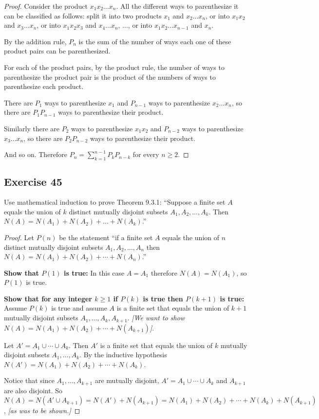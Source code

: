 \documentclass[14pt]{extarticle}
\begin{document}
\begin{proof}
     Consider the product \(x_1x_2 \ldots x_n\). All the different ways to parenthesize it can be classified as
     follows: split it into two products \(x_1\) and \(x_2 \ldots x_n\), or into \(x_1x_2\) and \(x_3 \ldots x_n\),
     or into \(x_1x_2x_3\) and \(x_4 \ldots x_n\), \(\ldots\), or into \(x_1x_2 \ldots x_{n-1}\) and \(x_n\).

     By the addition rule, $P_n$ is the sum of the number of ways each one of these product pairs can be parenthesized.

     For each of the product pairs, by the product rule, the number of ways to parenthesize the product pair is the
     product of the numbers of ways to parenthesize each product.

     There are \(P_1\) ways to parenthesize \(x_1\) and \(P_{n-1}\) ways to parenthesize \(x_2 \ldots x_n\), so
     there are \(P_1P_{n-1}\) ways to parenthesize their product.

     Similarly there are \(P_2\) ways to parenthesize \(x_1x_2\) and \(P_{n-2}\) ways to parenthesize \(x_3 \ldots x_n\), so
     there are \(P_2P_{n-2}\) ways to parenthesize their product.

     And so on. Therefore \(P_n = \sum_{k=1}^{n-1} P_k P_{n-k}\) for every \(n \geq 2\).
\end{proof}

\subsection{Exercise 45}
Use mathematical induction to prove Theorem 9.3.1: ``Suppose a finite set $A$ equals the union of $k$ distinct
mutually disjoint subsets \(A_1, A_2, \ldots, A_k\). Then \(N(A) = N(A_1) + N(A_2) + \ldots + N(A_k)\).''

\begin{proof}
     Let \(P(n)\) be the statement ``if a finite set $A$ equals the union of $n$ distinct mutually disjoint subsets
     \(A_1, A_2, \ldots, A_n\) then \(N(A) = N(A_1) + N(A_2) + \cdots + N(A_n)\).''

     {\bf Show that \(P(1)\) is true:} In this case \(A = A_1\) therefore \(N(A) = N(A_1)\), so \(P(1)\) is true.

          {\bf Show that for any integer \(k \geq 1\) if \(P(k)\) is true then \(P(k+1)\) is true:} Assume \(P(k)\) is true and
     assume \(A\) is a finite set that equals the union of $k+1$ mutually disjoint subsets \(A_1, \ldots, A_k, A_{k+1}\).
          {\it [We want to show \(N(A) = N(A_1) + N(A_2) + \cdots + N(A_{k+1})\)]}.

     Let \(A' = A_1 \cup \cdots \cup A_k\). Then \(A'\) is a finite set that equals the union of $k$ mutually disjoint
     subsets \(A_1, \ldots, A_k\). By the inductive hypothesis \(N(A') = N(A_1) + N(A_2) + \cdots + N(A_k)\).

     Notice that since \(A_1, \ldots, A_{k+1}\) are mutually disjoint, \(A' = A_1 \cup \cdots \cup A_k\) and \(A_{k+1}\)
     are also disjoint. So \(N(A) = N(A' \cup A_{k+1}) = N(A') + N(A_{k+1})=N(A_1) +N(A_2) + \cdots + N(A_k) + N(A_{k+1})\),
     {\it [as was to be shown.]}
\end{proof}
\end{document}
